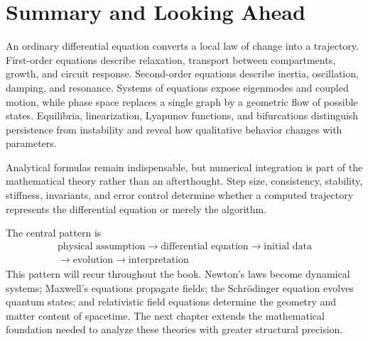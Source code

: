 \section{Summary and Looking Ahead}
\label{sec:ch4-summary}

An ordinary differential equation converts a local law of change into a trajectory. First-order equations describe relaxation, transport between compartments, growth, and circuit response. Second-order equations describe inertia, oscillation, damping, and resonance. Systems of equations expose eigenmodes and coupled motion, while phase space replaces a single graph by a geometric flow of possible states. Equilibria, linearization, Lyapunov functions, and bifurcations distinguish persistence from instability and reveal how qualitative behavior changes with parameters.

Analytical formulas remain indispensable, but numerical integration is part of the mathematical theory rather than an afterthought. Step size, consistency, stability, stiffness, invariants, and error control determine whether a computed trajectory represents the differential equation or merely the algorithm.

The central pattern is
\[
\boxed{\begin{gathered}
\text{physical assumption}\longrightarrow\text{differential equation}
\longrightarrow\text{initial data}\\
\longrightarrow\text{evolution}\longrightarrow\text{interpretation}
\end{gathered}}
\]
This pattern will recur throughout the book. Newton's laws become dynamical systems; Maxwell's equations propagate fields; the Schr\"odinger equation evolves quantum states; and relativistic field equations determine the geometry and matter content of spacetime. The next chapter extends the mathematical foundation needed to analyze these theories with greater structural precision.
